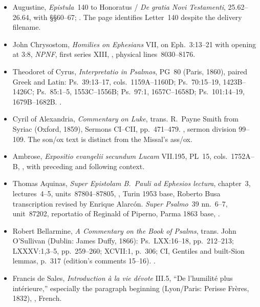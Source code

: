 {\begin{itemize}[leftmargin=1.1em,itemsep=0.3em,parsep=0pt]
\item Augustine, \textit{Epistula}~140 to Honoratus / \textit{De gratia Novi Testamenti}, 25.62--26.64, with §§60--67; . The page identifies Letter~140 despite the delivery filename.
\item John Chrysostom, \textit{Homilies on Ephesians} VII, on Eph.~3:13--21 with opening at 3:8, \textit{NPNF}, first series XIII, , physical lines~8030--8176.
\item Theodoret of Cyrus, \textit{Interpretatio in Psalmos}, PG~80 (Paris, 1860), paired Greek and Latin: Ps.~39:13--17, cols.~1159A--1160D; Ps.~70:15--19, 1423B--1426C; Ps.~85:1--5, 1553C--1556B; Ps.~97:1, 1657C--1658D; Ps.~101:14--19, 1679B--1682B. .
\item Cyril of Alexandria, \textit{Commentary on Luke}, trans. R.~Payne Smith from Syriac (Oxford, 1859), Sermons CI--CII, pp.~471--479. , sermon division 99--109. The son/ox text is distinct from the Missal's ass/ox.
\item Ambrose, \textit{Expositio evangelii secundum Lucam} VII.195, PL~15, cols.~1752A--B, , with preceding and following context.
\item Thomas Aquinas, \textit{Super Epistolam B.~Pauli ad Ephesios lectura}, chapter~3, lectures~4--5, units~87804--87805, , Turin 1953 base, Roberto Busa transcription revised by Enrique Alarcón. \textit{Super Psalmo}~39 nn.~6--7, unit~87202, reportatio of Reginald of Piperno, Parma 1863 base, .
\item Robert Bellarmine, \textit{A Commentary on the Book of Psalms}, trans. John O'Sullivan (Dublin: James Duffy, 1866): Ps.~LXX:16--18, pp.~212--213; LXXXV:1,3--5, pp.~259--260; XCVII:1, p.~306; CI, Gentiles and built-Sion lemmas, p.~317 (edition's comments 15--16). .
\item Francis de Sales, \textit{Introduction à la vie dévote} III.5, ``De l'humilité plus intérieure,'' especially the paragraph beginning  (Lyon/Paris: Perisse Frères, 1832), , French.

\end{itemize}}

